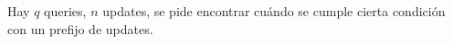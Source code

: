 
Hay $q$ queries, $n$ updates, se pide encontrar cuándo se cumple cierta condición con un prefijo de updates.\\